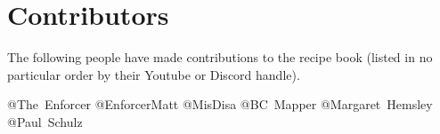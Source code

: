 \chapter{Contributors}
The following people have made contributions to the recipe book
(listed in no particular order by their Youtube or Discord handle).

\mbox{@The Enforcer\USA}\hfil
\mbox{@EnforcerMatt\USA}\hfil
\mbox{@MisDisa\USA}\hfil
\mbox{@BC Mapper\CAN}\hfil
\mbox{@Margaret Hemsley\AUS}\hfil
\mbox{@Paul Schulz\AUS}\hfil